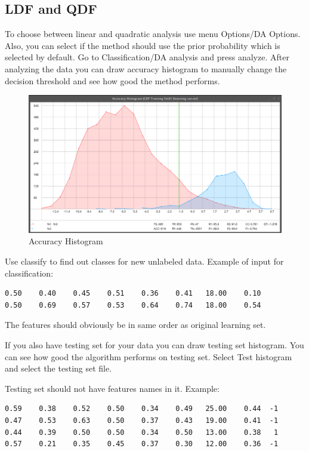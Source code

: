 \documentclass[a4paper,12pt,english]{report}
\begin{document}
\subsection*{LDF and QDF}
To choose between linear and quadratic analysis use menu Options/DA Options. Also, you can select if the method should use the prior probability which is selected by default. Go to Classification/DA analysis and press analyze. After analyzing the data you can draw accuracy histogram to manually change the decision threshold and see how good the method performs. 
 
\begin{figure}[htb]
\centering
\includegraphics[width=360pt]{fig11.png}
\caption{Accuracy Histogram}
\end{figure}
\newpage
Use classify to find out classes for new unlabeled data. Example of input for classification:

\begin{lstlisting}
0.50    0.40    0.45    0.51    0.36    0.41   18.00    0.10  
0.50    0.69    0.57    0.53    0.64    0.74   18.00    0.54   
\end{lstlisting}

The features should obviously be in same order as original learning set. 


If you also have testing set for your data you can draw testing set histogram. You can see how good the algorithm performs on testing set. Select Test histogram and select the testing set file.

Testing set should not have features names in it. Example:

\begin{lstlisting}
0.59    0.38    0.52    0.50    0.34    0.49   25.00    0.44  -1
0.47    0.53    0.63    0.50    0.37    0.43   19.00    0.41  -1
0.44    0.39    0.50    0.50    0.34    0.50   13.00    0.38   1
0.57    0.21    0.35    0.45    0.37    0.30   12.00    0.36  -1
\end{lstlisting}
\end{document}
